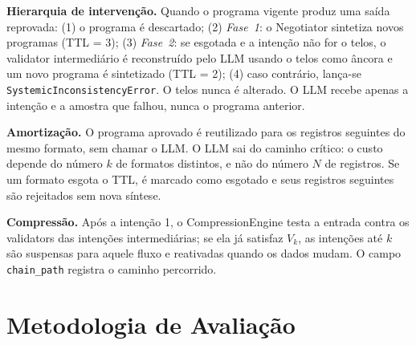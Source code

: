 \documentclass[sigconf,nonacm]{acmart}
\begin{document}
\begin{table}[h]
\caption{Componentes do IDAE e sua mutabilidade}
\label{tab:components}
\end{table}

\textbf{Hierarquia de intervenção.} Quando o programa vigente produz uma saída reprovada: (1) o programa é descartado; (2) \textit{Fase~1}: o Negotiator sintetiza novos programas (TTL = 3); (3) \textit{Fase~2}: se esgotada e a intenção não for o telos, o validator intermediário é reconstruído pelo LLM usando o telos como âncora e um novo programa é sintetizado (TTL = 2); (4) caso contrário, lança-se \texttt{SystemicInconsistencyError}. O telos nunca é alterado. O LLM recebe apenas a intenção e a amostra que falhou, nunca o programa anterior.

\textbf{Amortização.} O programa aprovado é reutilizado para os registros seguintes do mesmo formato, sem chamar o LLM. O LLM sai do caminho crítico: o custo depende do número $k$ de formatos distintos, e não do número $N$ de registros. Se um formato esgota o TTL, é marcado como esgotado e seus registros seguintes são rejeitados sem nova síntese.

\textbf{Compressão.} Após a intenção 1, o CompressionEngine testa a entrada contra os validators das intenções intermediárias; se ela já satisfaz $V_k$, as intenções até $k$ são suspensas para aquele fluxo e reativadas quando os dados mudam. O campo \texttt{chain\_path} registra o caminho percorrido.

\section{Metodologia de Avaliação}
\label{sec:metodo}
\end{document}
